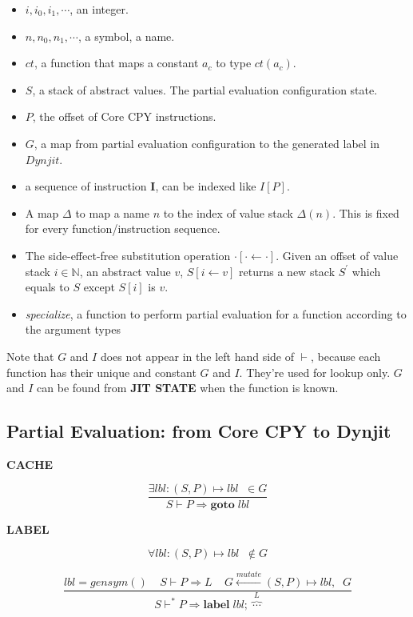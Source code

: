 \documentclass[12pt, a4paper]{report}
\newcommand{\rulegroup}[1]{
    \textbf{#1}
}
\newcommand{\gap}{ \;\;\;\; }
\begin{document}
\begin{itemize}
    \item $i, i_0, i_1, \cdots$, an integer.
    \item $n, n_0, n_1, \cdots$, a symbol, a name.
    \item $ct$, a function that maps a constant $a_c$ to type $ct(a_c)$.
    \item $S$, a stack of abstract values. The partial evaluation configuration state.
    \item $P$, the offset of Core CPY instructions.
    \item $G$, a map from partial evaluation configuration to the generated label in $Dynjit$.
    \item a sequence of instruction $\mathbf{I}$, can be indexed like $I[P]$.
    \item A map $\Delta$ to map a name $n$ to the index of value stack $\Delta(n)$. This is fixed for every function/instruction sequence.
    \item The side-effect-free substitution operation $\cdot[\cdot \leftarrow \cdot]$.
          Given an offset of value stack $i \in \mathbb{N}$, an abstract value $v$,
          $S[i \leftarrow v]$ returns a new stack $S^{'}$ which equals to $S$ except $S[i]$ is $v$.
    \item \textit{specialize}, a function to perform partial evaluation for a function according to the argument types
\end{itemize}

Note that $G$ and $I$ does not appear in the left hand side of $\vdash$, because each function has their unique and constant $G$ and $I$.
They're used for lookup only. $G$ and $I$ can be found from \textbf{JIT STATE} when the function is known.

\subsection*{Partial Evaluation: from Core CPY to Dynjit}

\hrulefill
\bigbreak

\rulegroup{CACHE}
$$
\dfrac{
    \exists \mathit{lbl} : (S, P) \mapsto \mathit{lbl} \; \; \in G
}{
    S \vdash P \Rightarrow \mathbf{goto} \; \mathit{lbl}
}
$$

\rulegroup{LABEL}

$$
\forall \mathit{lbl} : (S, P) \mapsto \mathit{lbl} \;\; \notin G
$$

\vspace*{-\baselineskip}
$$
\dfrac{
    \mathit{lbl} = gensym()
    \gap
    S \vdash P \Rightarrow L
    \gap
    G \overset{mutate}{\leftarrow} (S, P) \mapsto \mathit{lbl}, \;\;  G
}{
    S \vdash^{*} P \Rightarrow \mathbf{label} \; \mathit{lbl} ; \; \overbrace{\cdots}^{L}
}
$$
\end{document}
